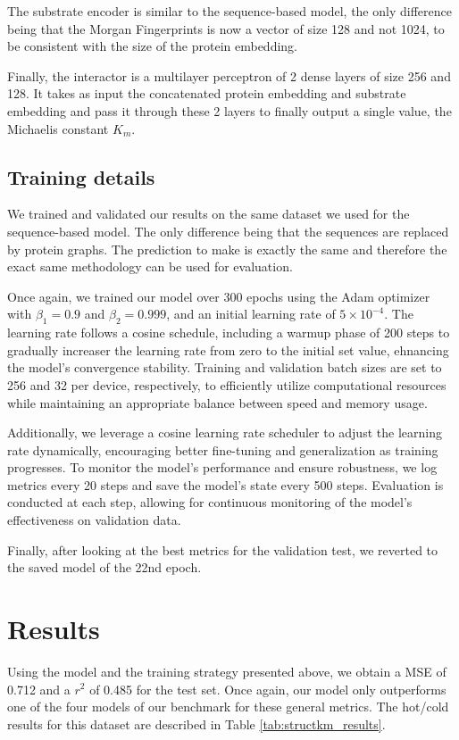 The substrate encoder is similar to the sequence-based model, the only difference being that the Morgan Fingerprints
is now a vector of size 128 and not 1024, to be consistent with the size of the protein embedding.

Finally, the interactor is a multilayer perceptron of 2 dense layers of size 256 and 128. It takes as input the
concatenated protein embedding and substrate embedding and pass it through these 2 layers to finally output a single
value, the Michaelis constant $K_m$.

\subsection{Training details}

We trained and validated our results on the same dataset we used for the sequence-based model. The only difference
being that the sequences are replaced by protein graphs. The prediction to make is exactly the same and 
therefore the exact same methodology can be used for evaluation.

Once again, we trained our model over 300 epochs using the Adam optimizer with $\beta_1=0.9$ and $\beta_2=0.999$, and an initial
learning rate of $5\times10^{-4}$. The learning rate follows a cosine schedule, including a warmup phase of 200
steps to gradually increaser the learning rate from zero to the initial set value, ehnancing the model's convergence
stability. Training and validation batch sizes are set to 256 and 32 per device, respectively, to efficiently
utilize computational resources while maintaining an appropriate balance between speed and memory usage. 

Additionally, we leverage a cosine learning rate scheduler to adjust the learning rate dynamically, 
encouraging better fine-tuning and generalization as training progresses. To monitor the model's performance 
and ensure robustness, we log metrics every 20 steps and save the model's state every 500 steps. 
Evaluation is conducted at each step, allowing for continuous monitoring of the model's effectiveness on 
validation data. 

Finally, after looking at the best metrics for the validation test, we reverted to the saved model of the 22nd epoch. 

\section{Results}

 Using the model and the training strategy presented above, we obtain a MSE of 0.712 and a $r^2$ of 0.485 for the test set. Once again, our model only outperforms one of the four models of our benchmark for these general metrics. The hot/cold results for this dataset are described in Table \ref{tab:structkm_results}.

